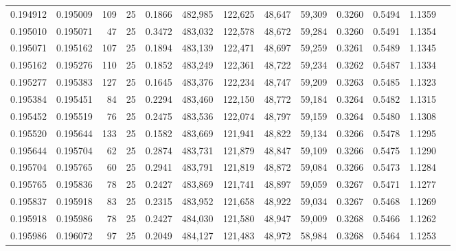 \begin{tabular}{rrrrrrrrrrrrr}
0.194912 & 0.195009 &   109 &  25 &                                     0.1866 & 482,985 & 122,625 &  48,647 &  59,309 & 0.3260 & 0.5494 & 1.1359 \\
0.195010 & 0.195071 &    47 &  25 &                                     0.3472 & 483,032 & 122,578 &  48,672 &  59,284 & 0.3260 & 0.5491 & 1.1354 \\
0.195071 & 0.195162 &   107 &  25 &                                     0.1894 & 483,139 & 122,471 &  48,697 &  59,259 & 0.3261 & 0.5489 & 1.1345 \\
0.195162 & 0.195276 &   110 &  25 &                                     0.1852 & 483,249 & 122,361 &  48,722 &  59,234 & 0.3262 & 0.5487 & 1.1334 \\
0.195277 & 0.195383 &   127 &  25 &                                     0.1645 & 483,376 & 122,234 &  48,747 &  59,209 & 0.3263 & 0.5485 & 1.1323 \\
0.195384 & 0.195451 &    84 &  25 &                                     0.2294 & 483,460 & 122,150 &  48,772 &  59,184 & 0.3264 & 0.5482 & 1.1315 \\
0.195452 & 0.195519 &    76 &  25 &                                     0.2475 & 483,536 & 122,074 &  48,797 &  59,159 & 0.3264 & 0.5480 & 1.1308 \\
0.195520 & 0.195644 &   133 &  25 &                                     0.1582 & 483,669 & 121,941 &  48,822 &  59,134 & 0.3266 & 0.5478 & 1.1295 \\
0.195644 & 0.195704 &    62 &  25 &                                     0.2874 & 483,731 & 121,879 &  48,847 &  59,109 & 0.3266 & 0.5475 & 1.1290 \\
0.195704 & 0.195765 &    60 &  25 &                                     0.2941 & 483,791 & 121,819 &  48,872 &  59,084 & 0.3266 & 0.5473 & 1.1284 \\
0.195765 & 0.195836 &    78 &  25 &                                     0.2427 & 483,869 & 121,741 &  48,897 &  59,059 & 0.3267 & 0.5471 & 1.1277 \\
0.195837 & 0.195918 &    83 &  25 &                                     0.2315 & 483,952 & 121,658 &  48,922 &  59,034 & 0.3267 & 0.5468 & 1.1269 \\
0.195918 & 0.195986 &    78 &  25 &                                     0.2427 & 484,030 & 121,580 &  48,947 &  59,009 & 0.3268 & 0.5466 & 1.1262 \\
0.195986 & 0.196072 &    97 &  25 &                                     0.2049 & 484,127 & 121,483 &  48,972 &  58,984 & 0.3268 & 0.5464 & 1.1253 \\

\end{tabular}
